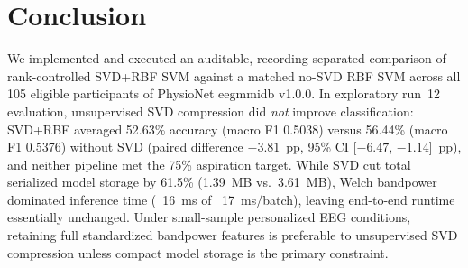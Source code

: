 \documentclass[conference]{IEEEtran}
\begin{document}
\section{Conclusion}
We implemented and executed an auditable, recording-separated comparison of
rank-controlled SVD+RBF SVM against a matched no-SVD RBF SVM across all 105
eligible participants of PhysioNet eegmmidb v1.0.0. In exploratory run~12
evaluation, unsupervised SVD compression did \emph{not} improve classification:
SVD+RBF averaged 52.63\% accuracy (macro F1 0.5038) versus 56.44\% (macro F1
0.5376) without SVD (paired difference $-3.81$~pp, 95\% CI [$-6.47$,
$-1.14$]~pp), and neither pipeline met the 75\% aspiration target. While SVD
cut total serialized model storage by 61.5\% (1.39~MB vs.\ 3.61~MB), Welch
bandpower dominated inference time (~16~ms of ~17~ms/batch), leaving end-to-end
runtime essentially unchanged. Under small-sample personalized EEG conditions,
retaining full standardized bandpower features is preferable to unsupervised
SVD compression unless compact model storage is the primary constraint.


\end{document}
